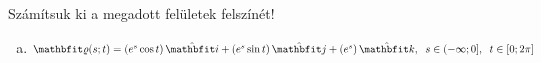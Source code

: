 \documentclass[exercise]{math-standalone}
\begin{document}
\begin{exercise}{Számítsuk ki a megadott felületek felszínét!}
{\begin{enumerate}[a)]
            A keresett felszín:
            \begin{align*}
              A
               & = \int_S \diff S
              = \int_1^2 \int_0^{2\pi}  \norma{\rvec n} \, \diff t \, \diff s
              = \int_1^2 \int_0^{2\pi}  \sqrt{4 s^4 + s^2} \, \diff t \, \diff s
              \\
               & = 2\pi \int_1^2 \sqrt{4 s^4 + s^2} \, \diff s
              = 2\pi \int_1^2 s \, \sqrt{4 s^2 + 1} \, \diff s
              = 2\pi \int_{u_1}^{u_2} \frac{1}{8} \, \sqrt{u} \, \diff u
              \\
               & = \frac{\pi}{4} \left[ \frac{2}{3} u^{3/2} \right]_{u_1}^{u_2}
              = \left[ \frac{\pi (4s^2 + 1)^{3/2}}{6} \right]_{1}^{2}
              = \frac{\pi}{6} \cdot (17^{3/2} - 5^{3/2}) \approx 4,9094
            \end{align*}

      \item $\surfv(s;t) = \ijk{e^s \cos t}{e^s \sin t}{e^s}, \;\; s \in (-\infty; 0], \;\; t \in [0; 2\pi]$


\end{enumerate}}
\end{exercise}
\end{document}
